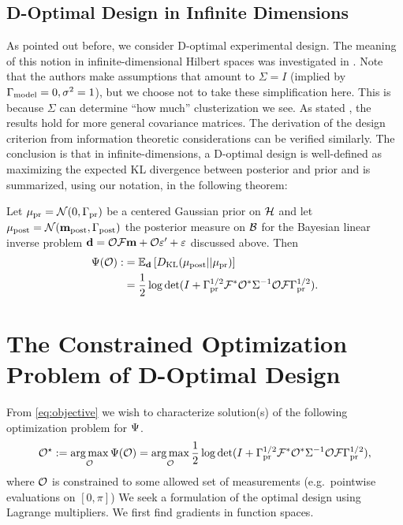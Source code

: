 \documentclass{amsart}
\numberwithin{equation}{section}
\begin{document}
\subsection{D-Optimal Design in Infinite Dimensions} 
As pointed out before, we consider D-optimal experimental design. The
meaning of this notion in infinite-dimensional Hilbert spaces was
investigated in \cite{AlexanderianGloorGhattas14}. Note that the
authors make assumptions that amount to $\Sigma=I$ (implied by
$\Gamma_{\textup{model}} = 0,\sigma^2=1$), but we choose not to take these
simplification here. This is because $\Sigma$ can determine ``how
much'' clusterization we see. As stated
\cite[pp. 681]{AlexanderianGloorGhattas14}, the results hold for more
general covariance matrices. The derivation of the design criterion
from information theoretic considerations can be verified similarly.
The conclusion is that in infinite-dimensions, a D-optimal design is
well-defined as maximizing the expected KL divergence between
posterior and prior and is summarized, using our notation, in the
following theorem:
\begin{theorem}
  Let $\mu_{\textup{pr}} = \mathcal{N}(0,\Gamma_{\textup{pr}})$ be a centered Gaussian prior
  on $\mathcal{H}$   and let $\mu_{\textup{post}} = \mathcal{N}(\mathbf{m}_{\textup{post}},\Gamma_{\textup{post}})$ 
  the posterior measure on $\mathcal{B}$ for the Bayesian linear
  inverse problem $\mathbf{d} =  \mathcal{O} \mathcal{F}\mathbf{m} + \mathcal{O} \varepsilon' + \varepsilon$ discussed
  above. Then 
  \begin{align}\label{eq:objective}
    \begin{split}
      \Psi( \mathcal{O}) :&= \mathbb{E}_{\mathbf{d}}\left [ D_{\text{KL}} (\mu_{\textup{post}} || \mu_{\textup{pr}} ) \right ] \\
      &= \frac12 \log \det 
      ( I + \Gamma_{\textup{pr}}^{1/2}  \mathcal{F} ^* \mathcal{O}^* \Sigma^{-1} \mathcal{O} \mathcal{F} \Gamma_{\textup{pr}}^{1/2}).
    \end{split}
  \end{align}
\end{theorem}


\section{The Constrained Optimization Problem of D-Optimal Design}\label{section:D and grad}
From \eqref{eq:objective} we wish to characterize solution(s) of the
following optimization problem for $\Psi$. %
\begin{align*}
  \mathcal{O}^{\star} := \operatorname*{arg\,max}_{\mathcal{O}} \Psi( \mathcal{O} ) 
  = \operatorname*{arg\,max}_{\mathcal{O}} \frac12 \log \det 
  (I + \Gamma_{\textup{pr}}^{1/2} \mathcal{F}^*\mathcal{O}^* \Sigma^{-1} \mathcal{O} \mathcal{F} \Gamma_{\textup{pr}}^{1/2}),
\end{align*}
where $\mathcal{O}$ is constrained to some allowed set of measurements
(e.g.\ pointwise evaluations on $[0,\pi]$)
We seek a formulation of the optimal design using Lagrange
multipliers. We first find gradients in function spaces.
\end{document}
